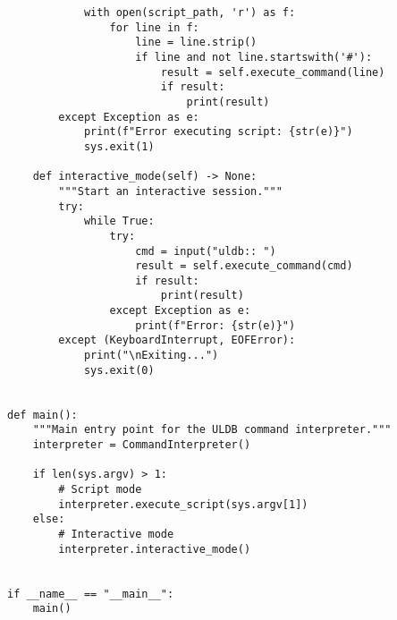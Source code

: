 \documentclass[utf8]{article}
\begin{document}
\begin{verbatim}
            with open(script_path, 'r') as f:
                for line in f:
                    line = line.strip()
                    if line and not line.startswith('#'):
                        result = self.execute_command(line)
                        if result:
                            print(result)
        except Exception as e:
            print(f"Error executing script: {str(e)}")
            sys.exit(1)
    
    def interactive_mode(self) -> None:
        """Start an interactive session."""
        try:
            while True:
                try:
                    cmd = input("uldb:: ")
                    result = self.execute_command(cmd)
                    if result:
                        print(result)
                except Exception as e:
                    print(f"Error: {str(e)}")
        except (KeyboardInterrupt, EOFError):
            print("\nExiting...")
            sys.exit(0)


def main():
    """Main entry point for the ULDB command interpreter."""
    interpreter = CommandInterpreter()
    
    if len(sys.argv) > 1:
        # Script mode
        interpreter.execute_script(sys.argv[1])
    else:
        # Interactive mode
        interpreter.interactive_mode()


if __name__ == "__main__":
    main() 
\end{verbatim}
\end{document}

